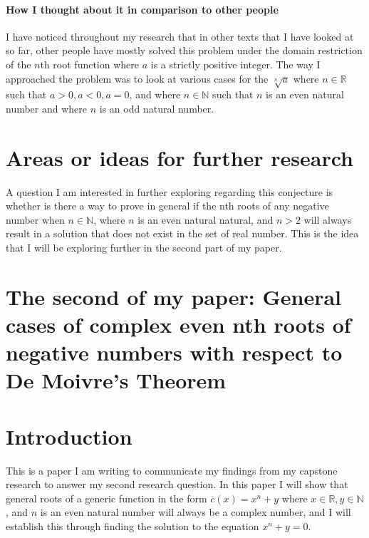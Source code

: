 \documentclass{article}
\begin{document}
\paragraph{How I thought about it in comparison to other people}
I have noticed throughout my research that in other texts that I have looked at so far, other people have mostly solved this problem under the domain restriction of the \(n\)th root function where \(a\) is a strictly positive integer. The way I approached the problem was to look at various cases for the  \(\sqrt[n]{a}\) where \(n \in \mathds{R}\) such that \(a > 0, a < 0, a = 0\), and where \(n \in \mathds{N}\) such that \(n\) is an even natural number and where \(n\) is an odd natural number.  

\section{Areas or ideas for further research}\hypertarget{Areas or ideas for further research}{}  

A question I am interested in further exploring regarding this conjecture is whether is there a way to prove in general if the nth roots of any negative number when \(n \in \mathds{N}\), where \(n\) is an even natural natural, and \(n > 2\) will always result in a solution that does not exist in the set of real number. This is the idea that I will be exploring further in the second part of my paper.  

\section*{The second of my paper: General cases of complex even nth roots of negative numbers with respect to De Moivre's Theorem}  

\section{Introduction}
This is a paper I am writing to communicate my findings from my capstone research to answer my second research question. In this paper I will show that general roots of a generic function in the form \(c(x) = x^n + y\) where \(x \in \mathds{R}, y \in \mathds{N}\), and \(n\) is an even natural number will always be a complex number, and I will establish this through finding the solution to the equation \(x^n + y = 0\). 
\end{document}
